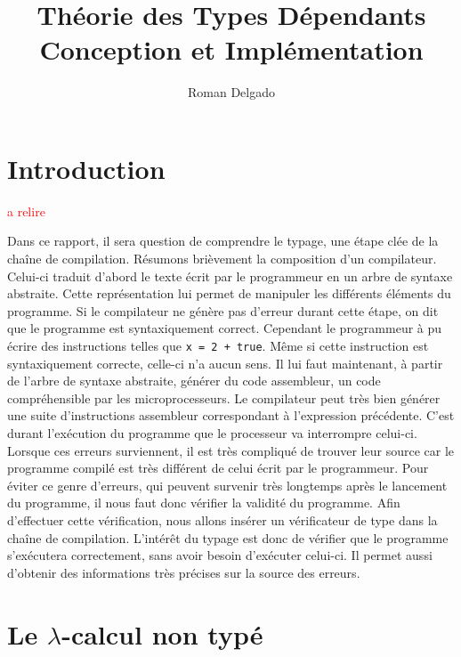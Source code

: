 \documentclass {article}
\title{Théorie des Types Dépendants\\Conception et Implémentation}
\author{Roman Delgado}
\date{}
\theoremstyle{definition}
\theoremstyle{remark}
\newcommand{\todo}[1]{\textcolor{red}{#1}}
\begin{document}
\maketitle



\vfill
\setcounter{tocdepth}{2}
\tableofcontents
\vfill

\clearpage


\section{Introduction}

\todo{a relire}


Dans ce rapport, il sera question de comprendre le typage, une  étape clée de la chaîne de compilation.
Résumons brièvement la composition d'un compilateur.
Celui-ci traduit d'abord le texte écrit par le programmeur en un arbre de syntaxe abstraite. Cette représentation lui permet
de manipuler les différents éléments du programme.
Si le compilateur ne génère pas d'erreur durant cette étape, on dit que le programme est syntaxiquement correct. Cependant 
le programmeur à pu écrire des instructions telles que \lstinline!x = 2 + true!. Même si cette instruction est syntaxiquement correcte, celle-ci 
n'a aucun sens. Il lui faut maintenant, à partir de l'arbre de syntaxe abstraite, générer du code assembleur, un code compréhensible 
par les microprocesseurs. Le compilateur peut très bien générer une suite d'instructions assembleur correspondant à l'expression 
précédente. C'est durant l'exécution du programme que le processeur va interrompre celui-ci. Lorsque ces erreurs surviennent, il est 
très compliqué de trouver leur source car le programme compilé est très différent de celui écrit par le programmeur.
Pour éviter ce genre d'erreurs, qui peuvent survenir très longtemps après le lancement du programme, 
il nous faut donc vérifier la validité du programme. Afin d'effectuer cette vérification, nous allons insérer un vérificateur
de type dans la chaîne de compilation.
L'intérêt du typage est donc de vérifier que le programme s'exécutera correctement, sans avoir besoin d'exécuter celui-ci. 
Il permet aussi d'obtenir des informations très précises sur la source des erreurs.

\section{Le $\lambda$-calcul non typé}
\label{sec:untyped}
\end{document}
